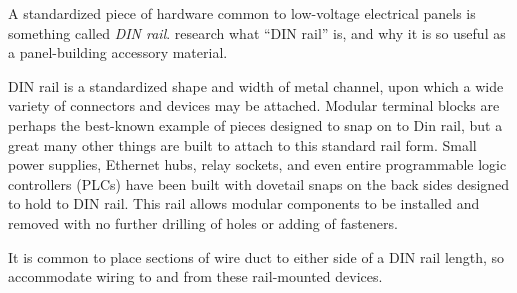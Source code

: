 

A standardized piece of hardware common to low-voltage electrical panels is something called {\it DIN rail}.  research what ``DIN rail'' is, and why it is so useful as a panel-building accessory material.







DIN rail is a standardized shape and width of metal channel, upon which a wide variety of connectors and devices may be attached.  Modular terminal blocks are perhaps the best-known example of pieces designed to snap on to Din rail, but a great many other things are built to attach to this standard rail form.  Small power supplies, Ethernet hubs, relay sockets, and even entire programmable logic controllers (PLCs) have been built with dovetail snaps on the back sides designed to hold to DIN rail.  This rail allows modular components to be installed and removed with no further drilling of holes or adding of fasteners.







It is common to place sections of wire duct to either side of a DIN rail length, so accommodate wiring to and from these rail-mounted devices.




